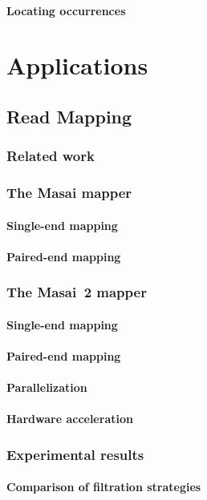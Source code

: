 \subsection{Locating occurrences}


\part{Applications}

\chapter{Read Mapping}
\section{Related work}
\section{The Masai mapper}
\subsection{Single-end mapping}
\subsection{Paired-end mapping}
\section{The Masai~2 mapper}
\subsection{Single-end mapping}
\subsection{Paired-end mapping}
\subsection{Parallelization}
\subsection{Hardware acceleration}
\section{Experimental results}
\subsection{Comparison of filtration strategies}
